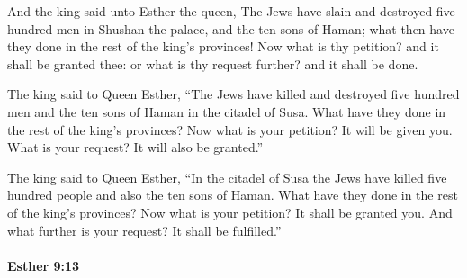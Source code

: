 			\begin{versebox}
					\item[BHS] 
					\item[LXX] 
					\item[ASV] And the king said unto Esther the queen, The Jews have slain and destroyed five hundred men in Shushan the palace, and the ten sons of Haman; what then have they done in the rest of the king's provinces! Now what is thy petition? and it shall be granted thee: or what is thy request further? and it shall be done.
					\item[NIV] The king said to Queen Esther, “The Jews have killed and destroyed five hundred men and the ten sons of Haman in the citadel of Susa. What have they done in the rest of the king’s provinces? Now what is your petition? It will be given you. What is your request? It will also be granted.”
					\item[NRSV] The king said to Queen Esther, “In the citadel of Susa the Jews have killed five hundred people and also the ten sons of Haman. What have they done in the rest of the king’s provinces? Now what is your petition? It shall be granted you. And what further is your request? It shall be fulfilled.”
			\end{versebox}

		\paragraph{Esther 9:13} %
			\label{ESTHER-9-13}

